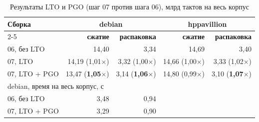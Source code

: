\begin{table}[H]
\caption{Результаты LTO и PGO (шаг 07 против шага 06), млрд тактов на весь корпус}
\label{tab:res-13}
\begin{tabletext}
\centering
\begin{tabular}{|l|r|r|r|r|}
\hline
\multirow{2}{*}{\textbf{Сборка}} & \multicolumn{2}{c|}{\textbf{debian}} & \multicolumn{2}{c|}{\textbf{hppavillion}} \\
\cline{2-5}
 & \textbf{сжатие} & \textbf{распаковка} & \textbf{сжатие} & \textbf{распаковка} \\
\hline
06, без LTO & 14,40 & 3,34 & 14,69 & 3,40 \\
07, LTO & 14,19 (1,01$\times$) & 3,32 (1,00$\times$) & 14,66 (1,00$\times$) & 3,33 (1,02$\times$) \\
07, LTO + PGO & 13,47 (\textbf{1,05$\times$}) & 3,14 (\textbf{1,06$\times$}) & 14,80 (0,99$\times$) & 3,10 (\textbf{1,07$\times$}) \\
\hline
\multicolumn{5}{|l|}{debian, время на весь корпус, с} \\
\hline
06, без LTO & 3,48 & 0,94 & \multicolumn{2}{c|}{} \\
07, LTO + PGO & 3,29 & 0,90 & \multicolumn{2}{c|}{} \\
\hline
\end{tabular}
\end{tabletext}
\end{table}

